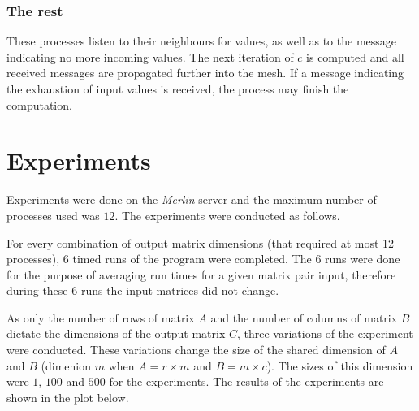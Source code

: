\documentclass[pdftex, 11pt, a4paper, titlepage]{article}
\begin{document}
    \subsubsection*{The rest}
    These processes listen to their neighbours for values, as well as to the message
    indicating no more incoming values. The next iteration of $c$ is computed and
    all received messages are propagated further into the mesh. If a message
    indicating the exhaustion of input values is received, the process may finish
    the computation.

    \section{Experiments}
    Experiments were done on the \emph{Merlin} server and the maximum number of processes
    used was $12$. The experiments were conducted as follows.

    For every combination of output matrix dimensions (that required at most 12 processes),
    6 timed runs of the program were completed. The 6 runs were done for the purpose of
    averaging run times for a given matrix pair input, therefore during these 6 runs the
    input matrices did not change.

    As only the number of rows of matrix $A$ and the number of columns of matrix $B$
    dictate the dimensions of the output matrix $C$, three variations of the experiment
    were conducted. These variations change the size of the shared dimension of $A$
    and $B$ (dimenion $m$ when $A = r \times m$ and $B = m \times c$). The sizes of
    this dimension were $1$, $100$ and $500$ for the experiments. The results of the
    experiments are shown in the plot below.
\end{document}

